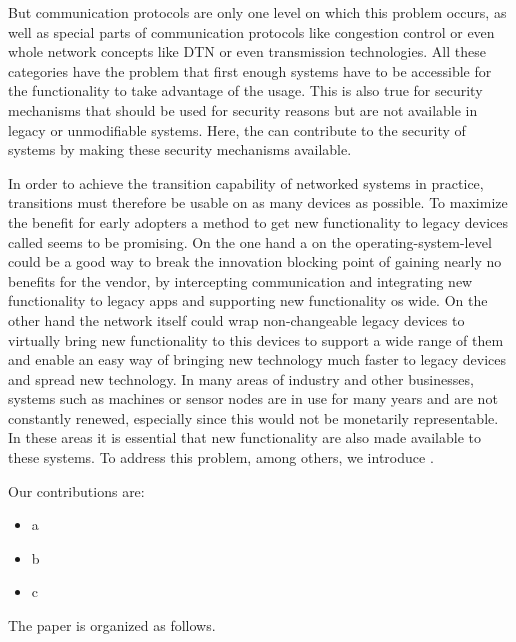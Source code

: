 But communication protocols are only one level on which this problem occurs, as well as special parts of communication protocols like congestion control or even whole network concepts like DTN or even transmission technologies. 
All these categories have the problem that first enough systems have to be accessible for the functionality to take advantage of the usage. 
This is also true for security mechanisms that should be used for security reasons but are not available in legacy or unmodifiable systems. 
Here, the \mm can contribute to the security of systems by making these security mechanisms available.

In order to achieve the transition capability of networked systems in practice, transitions must therefore be usable on as many devices as possible.
To maximize the benefit for early adopters a method to get new functionality to legacy devices called  \mm seems to be promising.
On the one hand a \mm on the operating-system-level could be a good way to break the innovation blocking point of gaining nearly no benefits for the vendor, by intercepting communication and integrating new functionality to legacy apps and supporting new functionality os wide.
On the other hand the network itself could wrap non-changeable legacy devices to virtually bring new functionality to this devices to support a wide range of them and enable an easy way of bringing new technology much faster to legacy devices and spread new technology. 
In many areas of industry and other businesses, systems such as machines or sensor nodes are in use for many years and are not constantly renewed, especially since this would not be monetarily representable.
In these areas it is essential that new functionality are also made available to these systems.
To address this problem, among others, we introduce \mm. 




Our contributions are:

\begin{itemize}
 \item a
 \item b 
 \item c
\end{itemize}

The paper is organized as follows. 